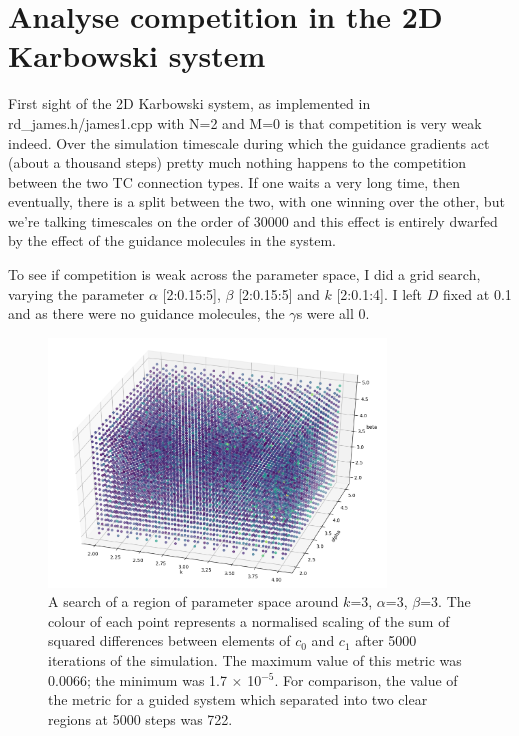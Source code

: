 \documentclass[11pt, a4paper]{article}
\newcommand{\code}[1]{\textsf{#1}}
\begin{document}
\section{Analyse competition in the 2D Karbowski system}

First sight of the 2D Karbowski system, as implemented in
\code{rd\_james.h/james1.cpp} with N=2 and M=0 is that competition is very
weak indeed. Over the simulation timescale during which the guidance
gradients act (about a thousand steps) pretty much nothing happens to
the competition between the two TC connection types. If one waits a
very long time, then eventually, there is a split between the two,
with one winning over the other, but we're talking timescales on the
order of 30000 and this effect is entirely dwarfed by the effect of
the guidance molecules in the system.

To see if competition is weak across the parameter space, I did a grid
search, varying the parameter $\alpha$ [2:0.15:5], $\beta$ [2:0.15:5]
and $k$ [2:0.1:4]. I left $D$ fixed at 0.1 and as there were no
guidance molecules, the $\gamma$s were all 0.

\begin{figure}[htb!]
\centering
\includegraphics[width=0.8\textwidth]{./plots/ps_2N0M.png}
\caption[Parameter space search.]
{A search of a region of parameter space around $k$=3, $\alpha$=3,
$\beta$=3. The colour of each point represents a normalised scaling of
the sum of squared differences between elements of $c_0$ and $c_1$
after 5000 iterations of the simulation. The maximum value of this
metric was 0.0066; the minimum was 1.7 $\times$ 10$^{-5}$. For
comparison, the value of the metric for a guided system which
separated into two clear regions at 5000 steps was 722.}
\label{fig:ps_2N0M}
\end{figure}
\end{document}
